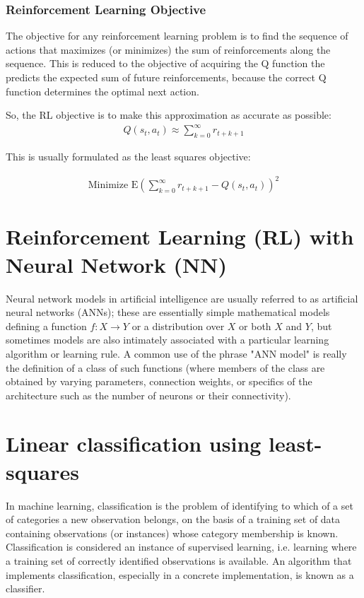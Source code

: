 \documentclass[12pt]{report}
\begin{document}
\subsubsection{Reinforcement Learning Objective}
The objective for any reinforcement learning problem is to find the sequence of actions that maximizes (or minimizes) the sum of reinforcements along the sequence. This is reduced to the objective of acquiring the Q function the predicts the expected sum of future reinforcements, because the correct Q function determines the optimal next action.

So, the RL objective is to make this approximation as accurate as possible:
\begin{align*}
      Q(s_t,a_t) \approx \sum_{k=0}^\infty r_{t+k+1}
\end{align*}

This is usually formulated as the least squares objective:


    \begin{align*}
      \text{Minimize } \mathrm{E} \left ( \sum_{k=0}^\infty r_{t+k+1} - Q(s_t,a_t)\right )^2
    \end{align*}
\section{Reinforcement Learning (RL) with Neural Network (NN)}

Neural network models in artificial intelligence are usually referred to as artificial neural networks (ANNs); these are essentially simple mathematical models defining a function $\textstyle f : X \rightarrow Y $ or a distribution over $\textstyle X $ or both $\textstyle X $ and $\textstyle Y$, but sometimes models are also intimately associated with a particular learning algorithm or learning rule. A common use of the phrase "ANN model" is really the definition of a class of such functions (where members of the class are obtained by varying parameters, connection weights, or specifics of the architecture such as the number of neurons or their connectivity).
\section{Linear classification using least-squares}
In machine learning, classification is the problem of identifying to which of a set of categories a new observation belongs, on the basis of a training set of data containing observations (or instances) whose category membership is known. Classification is considered an instance of supervised learning, i.e. learning where a training set of correctly identified observations is available.
An algorithm that implements classification, especially in a concrete implementation, is known as a classifier. 
\end{document}
